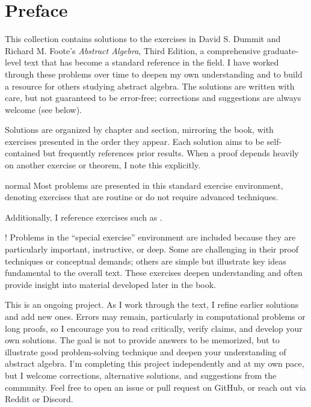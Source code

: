 \section*{Preface}

This collection contains solutions to the exercises in David S. Dummit and Richard M. Foote's \textit{Abstract Algebra}, Third Edition, a comprehensive graduate-level text that has become a standard reference in the field.
I have worked through these problems over time to deepen my own understanding and to build a resource for others studying abstract algebra.
The solutions are written with care, but not guaranteed to be error-free; corrections and suggestions are always welcome (see below).

Solutions are organized by chapter and section, mirroring the book, with exercises presented in the order they appear.
Each solution aims to be self-contained but frequently references prior results.
When a proof depends heavily on another exercise or theorem, I note this explicitly.
\begin{exercise}{normal}
    Most problems are presented in this standard exercise environment, denoting exercises that are routine or do not require advanced techniques.

	


	Additionally, I reference exercises such as .
\end{exercise}
\begin{exercise}!
    Problems in the ``special exercise'' environment are included because they are particularly important, instructive, or deep.
	Some are challenging in their proof techniques or conceptual demands; others are simple but illustrate key ideas fundamental to the overall text.
	These exercises deepen understanding and often provide insight into material developed later in the book.
\end{exercise}
This is an ongoing project.
As I work through the text, I refine earlier solutions and add new ones.
Errors may remain, particularly in computational problems or long proofs, so I encourage you to read critically, verify claims, and develop your own solutions.
The goal is not to provide answers to be memorized, but to illustrate good problem-solving technique and deepen your understanding of abstract algebra.
I'm completing this project independently and at my own pace, but I welcome corrections, alternative solutions, and suggestions from the community.
Feel free to open an issue or pull request on GitHub, or reach out via Reddit or Discord.

